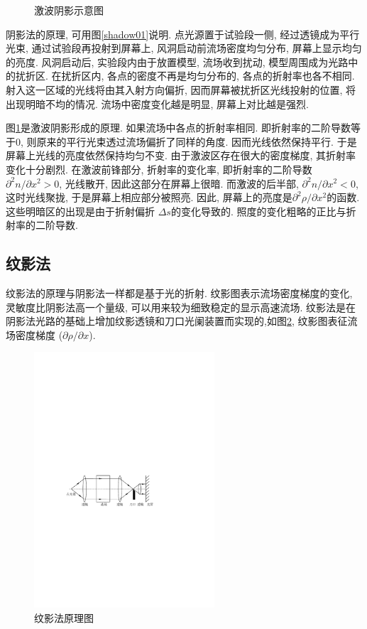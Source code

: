 \documentclass[12pt,a4paper,boxed,titlepage]{caspset}
\begin{document}
\begin{figure}[!htb]
\begin{minipage}[b]{.5\textwidth}
\caption{\label{shadow02}激波阴影示意图}
\end{minipage}
\end{figure}

阴影法的原理, 可用图\ref{shadow01}说明. 点光源置于试验段一侧, 经过透镜成为平行光束, 通过试验段再投射到屏幕上, 风洞启动前流场密度均匀分布, 屏幕上显示均匀的亮度. 风洞启动后, 实验段内由于放置模型, 流场收到扰动, 模型周围成为光路中的扰折区. 在扰折区内, 各点的密度不再是均匀分布的, 各点的折射率也各不相同. 射入这一区域的光线将由其入射方向偏折, 因而屏幕被扰折区光线投射的位置, 将出现明暗不均的情况. 流场中密度变化越是明显, 屏幕上对比越是强烈.

图\ref{shadow02}是激波阴影形成的原理. 如果流场中各点的折射率相同. 即折射率的二阶导数等于0, 则原来的平行光束透过流场偏折了同样的角度. 因而光线依然保持平行. 于是屏幕上光线的亮度依然保持均匀不变.
由于激波区存在很大的密度梯度, 其折射率变化十分剧烈. 在激波前锋部分, 折射率的变化率, 即折射率的二阶导数$\partial^2n/\partial x^2>0$, 光线散开, 因此这部分在屏幕上很暗. 而激波的后半部, $\partial^2n/\partial x^2<0$, 这时光线聚拢, 于是屏幕上相应部分被照亮.
因此, 屏幕上的亮度是$\partial^2\rho/\partial x^2$的函数. 这些明暗区的出现是由于折射偏折 $\Delta s$的变化导致的. 照度的变化粗略的正比与折射率的二阶导数.

\subsection{纹影法}\label{basicschlieren}

纹影法的原理与阴影法一样都是基于光的折射. 纹影图表示流场密度梯度的变化, 灵敏度比阴影法高一个量级, 可以用来较为细致稳定的显示高速流场.
纹影法是在阴影法光路的基础上增加纹影透镜和刀口光阑装置而实现的,如图\ref{schlieren01}, 纹影图表征流场密度梯度 ($\partial\rho/\partial x$).
\begin{figure}[!htb]
\centering
\includegraphics[width=0.6\textwidth]{schlieren01.pdf}
\caption{\label{schlieren01}纹影法原理图}
\end{figure}
\end{document}

